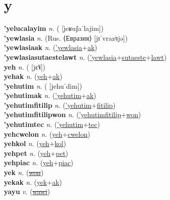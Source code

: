 \section{y}

\textbf{'yelucalayim} \textit{n.} ( [jeʁuʃaˈlajim])
 \label{'yelucalayim} \\
\textbf{'yewlasia} \textit{n.} (Rus. ⟨Евразия⟩ [jɪˈvrazʲɪjə])
 \label{'yewlasia} \\
\textbf{'yewlasiaak} \textit{n.} (\hyperref['yewlasia]{'yewlasia}+\hyperref[ak]{ak})
 \label{'yewlasiaak} \\
\textbf{'yewlasiasutaestelawt} \textit{n.} (\hyperref['yewlasia]{'yewlasia}+\hyperref[sutaeste]{sutaeste}+\hyperref[lawt]{lawt})
 \label{'yewlasiasutaestelawt} \\
\textbf{yeh} \textit{n.} ( [jɛ˥˩])
 \label{yeh} \\
\textbf{yehak} \textit{n.} (\hyperref[yeh]{yeh}+\hyperref[ak]{ak})
 \label{yehak} \\
\textbf{'yehutim} \textit{n.} ( [jehuˈdim])
 \label{'yehutim} \\
\textbf{'yehutimak} \textit{n.} (\hyperref['yehutim]{'yehutim}+\hyperref[ak]{ak})
 \label{'yehutimak} \\
\textbf{'yehutimfitilip} \textit{n.} (\hyperref['yehutim]{'yehutim}+\hyperref[fitilip]{fitilip})
 \label{'yehutimfitilip} \\
\textbf{'yehutimfitilipwon} \textit{n.} (\hyperref['yehutimfitilip]{'yehutimfitilip}+\hyperref[won]{won})
 \label{'yehutimfitilipwon} \\
\textbf{'yehutimtec} \textit{n.} (\hyperref['yehutim]{'yehutim}+\hyperref[tec]{tec})
 \label{'yehutimtec} \\
\textbf{yehcwelon} \textit{n.} (\hyperref[yeh]{yeh}+\hyperref[cwelon]{cwelon})
 \label{yehcwelon} \\
\textbf{yehkol} \textit{n.} (\hyperref[yeh]{yeh}+\hyperref[kol]{kol})
 \label{yehkol} \\
\textbf{yehpet} \textit{n.} (\hyperref[yeh]{yeh}+\hyperref[pet]{pet})
 \label{yehpet} \\
\textbf{yehpiac} \textit{n.} (\hyperref[yeh]{yeh}+\hyperref[piac]{piac})
 \label{yehpiac} \\
\textbf{yek} \textit{n.} (\hyperref[won]{\sout{won}})
 \label{yek} \\
\textbf{yekak} \textit{n.} (\hyperref[yek]{yek}+\hyperref[ak]{ak})
 \label{yekak} \\
\textbf{yayu} \textit{v.} (\hyperref[wawi]{\sout{wawi}})
